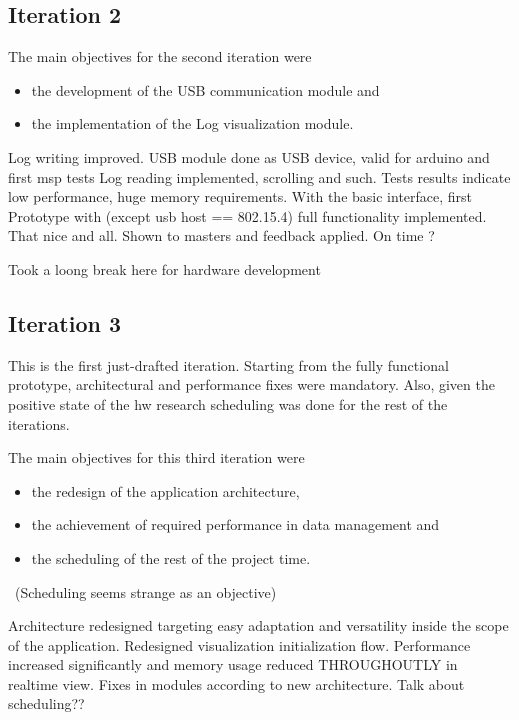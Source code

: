 			\begin{comment}
			Results and adaptation of pre-planned it2
			Risk evolution!?
			\end{comment}
			
		\subsection{Iteration 2}

			The main objectives for the second iteration were
			\begin{itemize} 
				\item the development of the USB communication module and
				\item the implementation of the Log visualization module.
			\end{itemize}

			Log writing improved.
			USB module done as USB device, valid for arduino and first msp tests
			Log reading implemented, scrolling and such. Tests results indicate low performance, huge memory requirements.
			With the basic interface, first Prototype with (except usb host == 802.15.4) full functionality implemented. That nice and all. Shown to masters and feedback applied.
			On time ?

			Took a loong break here for hardware development

		\subsection{Iteration 3}
			This is the first just-drafted iteration. Starting from the fully functional prototype, architectural and performance fixes were mandatory. Also, given the positive state of the hw research scheduling was done for the rest of the iterations.

			The main objectives for this third iteration were
			\begin{itemize} 
				\item the redesign of the application architecture, 
				\item the achievement of required performance in data management and
				\item the scheduling of the rest of the project time.
			\end{itemize}

			~(Scheduling seems strange as an objective)~

			Architecture redesigned targeting easy adaptation and versatility inside the scope of the application. Redesigned visualization initialization flow.
			Performance increased significantly and memory usage reduced THROUGHOUTLY in realtime view.
			Fixes in modules according to new architecture.
			Talk about scheduling??

